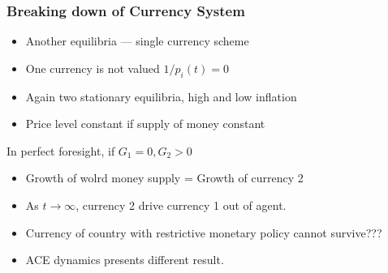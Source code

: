 \begin{frame}
    \frametitle{Breaking down of Currency System}

    \begin{itemize}
        \item Another equilibria --- single currency scheme
        \item One currency is not valued $1/p_i(t) = 0$
        \item Again two stationary equilibria, high and low inflation
        \item Price level constant if supply of money constant
    \end{itemize}


    \vfill
    In perfect foresight, if $G_1 = 0, G_2 > 0$
    \begin{itemize}
        \item Growth of wolrd money supply = Growth of currency 2
        \item As $t \to \infty$, currency 2 drive currency 1 out of agent.
        \item Currency of country with restrictive monetary policy cannot survive???
        \item ACE dynamics presents different result.
    \end{itemize}
\end{frame}